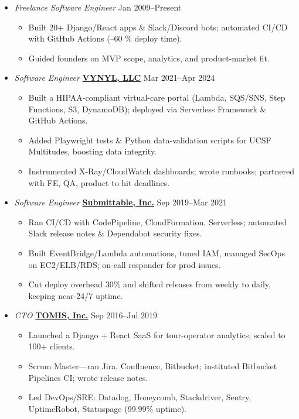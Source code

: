 \documentclass[10pt]{article}
\begin{document}
\begin{itemize}
\item \textit{Freelance Software Engineer} \hfill Jan 2009–Present
  \begin{itemize}[leftmargin=1em]
    \item Built 20+ Django/React apps \& Slack/Discord bots; automated CI/CD with GitHub Actions (–60 \% deploy time).
    \item Guided founders on MVP scope, analytics, and product-market fit.
  \end{itemize}

\item \textit{Software Engineer} \textbf{\href{https://vynyl.com}{VYNYL, LLC}} \hfill Mar 2021–Apr 2024
  \begin{itemize}[leftmargin=1em]
    \item Built a HIPAA-compliant virtual-care portal (Lambda, SQS/SNS, Step Functions, S3, DynamoDB); deployed via Serverless Framework \& GitHub Actions.
    \item Added Playwright tests \& Python data-validation scripts for UCSF Multitudes, boosting data integrity.
    \item Instrumented X-Ray/CloudWatch dashboards; wrote runbooks; partnered with FE, QA, product to hit deadlines.
  \end{itemize}

\item \textit{Software Engineer} \textbf{\href{https://submittable.com}{Submittable, Inc.}} \hfill Sep 2019–Mar 2021
  \begin{itemize}[leftmargin=1em]
    \item Ran CI/CD with CodePipeline, CloudFormation, Serverless; automated Slack release notes \& Dependabot security fixes.
    \item Built EventBridge/Lambda automations, tuned IAM, managed SecOps on EC2/ELB/RDS; on-call responder for prod issues.
    \item Cut deploy overhead 30\% and shifted releases from weekly to daily, keeping near-24/7 uptime.
  \end{itemize}

\item \textit{CTO} \textbf{\href{https://tomis.tech}{TOMIS, Inc.}} \hfill Sep 2016–Jul 2019
  \begin{itemize}[leftmargin=1em]
    \item Launched a Django + React SaaS for tour-operator analytics; scaled to 100+ clients.
    \item Scrum Master—ran Jira, Confluence, Bitbucket; instituted Bitbucket Pipelines CI; wrote release notes.
    \item Led DevOps/SRE: Datadog, Honeycomb, Stackdriver, Sentry, UptimeRobot, Statuspage (99.99\% uptime).
  \end{itemize}


\end{itemize}
\end{document}
